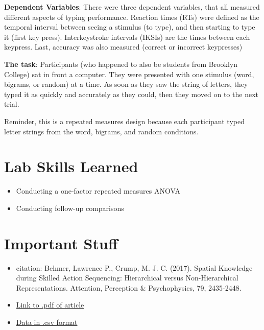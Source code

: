 \documentclass[]{book}
\providecommand{\tightlist}{%
  \setlength{\itemsep}{0pt}\setlength{\parskip}{0pt}}
\theoremstyle{definition}
\theoremstyle{definition}
\theoremstyle{definition}
\theoremstyle{remark}
\begin{document}
\textbf{Dependent Variables}: There were three dependent variables, that
all measured different aspects of typing performance. Reaction times
(RTs) were defined as the temporal interval between seeing a stimulus
(to type), and then starting to type it (first key press).
Interkeystroke intervals (IKSIs) are the times between each keypress.
Last, accuracy was also measured (correct or incorrect keypresses)

\textbf{The task}: Participants (who happened to also be students from
Brooklyn College) sat in front a computer. They were presented with one
stimulus (word, bigrams, or random) at a time. As soon as they saw the
string of letters, they typed it as quickly and accurately as they
could, then they moved on to the next trial.

Reminder, this is a repeated measures design because each participant
typed letter strings from the word, bigrams, and random conditions.

\section{Lab Skills Learned}\label{lab-skills-learned-3}

\begin{itemize}
\tightlist
\item
  Conducting a one-factor repeated measures ANOVA
\item
  Conducting follow-up comparisons
\end{itemize}

\section{Important Stuff}\label{important-stuff-3}

\begin{itemize}
\tightlist
\item
  citation: Behmer, Lawrence P., Crump, M. J. C. (2017). Spatial
  Knowledge during Skilled Action Sequencing: Hierarchical versus
  Non-Hierarchical Representations. Attention, Perception \&
  Psychophysics, 79, 2435-2448.
\item
  \href{https://github.com/CrumpLab/CrumpLab.github.io/raw/master/files/8753/Behmer\%20and\%20Crump\%20-\%202017.pdf}{Link
  to .pdf of article}
\item
  \href{https://github.com/CrumpLab/statisticsLab/raw/master/data/exp1_BehmerCrumpAPP.csv}{Data
  in .csv format}
\end{itemize}
\end{document}
